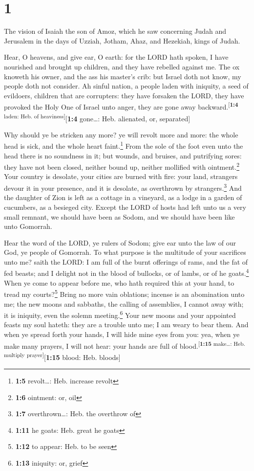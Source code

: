 \hypertarget{section}{%
\section{1}\label{section}}

 The vision of Isaiah the son of Amoz, which he saw
concerning Judah and Jerusalem in the days of Uzziah, Jotham, Ahaz, and
Hezekiah, kings of Judah.

 Hear, O heavens, and give ear, O earth: for the LORD hath
spoken, I have nourished and brought up children, and they have rebelled
against me.  The ox knoweth his owner, and the ass his
master's crib: but Israel doth not know, my people doth not consider.
 Ah sinful nation, a people laden with iniquity, a seed of
evildoers, children that are corrupters: they have forsaken the LORD,
they have provoked the Holy One of Israel unto anger, they are gone away
backward.\textsuperscript{{[}\textbf{1:4} laden: Heb. of
heaviness{]}}{[}\textbf{1:4} gone\ldots: Heb. alienated, or,
separated{]}

 Why should ye be stricken any more? ye will revolt more
and more: the whole head is sick, and the whole heart faint.\footnote{\textbf{1:5}
  revolt\ldots: Heb. increase revolt}  From the sole of
the foot even unto the head there is no soundness in it; but wounds, and
bruises, and putrifying sores: they have not been closed, neither bound
up, neither mollified with ointment.\footnote{\textbf{1:6} ointment: or,
  oil}  Your country is desolate, your cities are burned
with fire: your land, strangers devour it in your presence, and it is
desolate, as overthrown by strangers.\footnote{\textbf{1:7}
  overthrown\ldots: Heb. the overthrow of}  And the
daughter of Zion is left as a cottage in a vineyard, as a lodge in a
garden of cucumbers, as a besieged city.  Except the LORD
of hosts had left unto us a very small remnant, we should have been as
Sodom, and we should have been like unto Gomorrah.

 Hear the word of the LORD, ye rulers of Sodom; give ear
unto the law of our God, ye people of Gomorrah.  To what
purpose is the multitude of your sacrifices unto me? saith the LORD: I
am full of the burnt offerings of rams, and the fat of fed beasts; and I
delight not in the blood of bullocks, or of lambs, or of he
goats.\footnote{\textbf{1:11} he goats: Heb. great he goats}
 When ye come to appear before me, who hath required this
at your hand, to tread my courts?\footnote{\textbf{1:12} to appear: Heb.
  to be seen}  Bring no more vain oblations; incense is
an abomination unto me; the new moons and sabbaths, the calling of
assemblies, I cannot away with; it is iniquity, even the solemn
meeting.\footnote{\textbf{1:13} iniquity: or, grief} 
Your new moons and your appointed feasts my soul hateth: they are a
trouble unto me; I am weary to bear them.  And when ye
spread forth your hands, I will hide mine eyes from you: yea, when ye
make many prayers, I will not hear: your hands are full of
blood.\textsuperscript{{[}\textbf{1:15} make\ldots: Heb. multiply
prayer{]}}{[}\textbf{1:15} blood: Heb. bloods{]}

